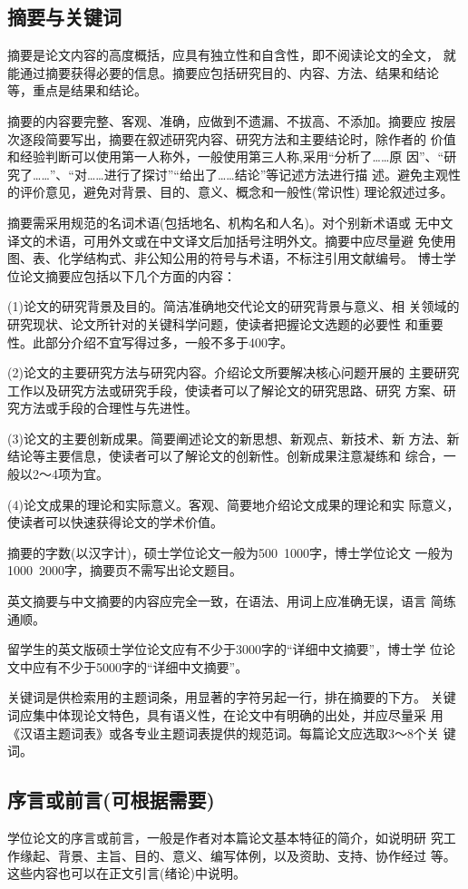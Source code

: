 \subsection{摘要与关键词}
摘要是论文内容的高度概括，应具有独立性和自含性，即不阅读论文的全文，
就能通过摘要获得必要的信息。摘要应包括研究目的、内容、方法、结果和结论
等，重点是结果和结论。 

摘要的内容要完整、客观、准确，应做到不遗漏、不拔高、不添加。摘要应
按层次逐段简要写出，摘要在叙述研究内容、研究方法和主要结论时，除作者的
价值和经验判断可以使用第一人称外，一般使用第三人称,采用“分析了……原
因”、“研究了……”、“对……进行了探讨”“给出了……结论”等记述方法进行描
述。避免主观性的评价意见，避免对背景、目的、意义、概念和一般性(常识性)
理论叙述过多。 

摘要需采用规范的名词术语(包括地名、机构名和人名)。对个别新术语或
无中文译文的术语，可用外文或在中文译文后加括号注明外文。摘要中应尽量避
免使用图、表、化学结构式、非公知公用的符号与术语，不标注引用文献编号。 
博士学位论文摘要应包括以下几个方面的内容： 

(1)论文的研究背景及目的。简洁准确地交代论文的研究背景与意义、相
关领域的研究现状、论文所针对的关键科学问题，使读者把握论文选题的必要性
和重要性。此部分介绍不宜写得过多，一般不多于400字。 

(2)论文的主要研究方法与研究内容。介绍论文所要解决核心问题开展的
主要研究工作以及研究方法或研究手段，使读者可以了解论文的研究思路、研究
方案、研究方法或手段的合理性与先进性。 

(3)论文的主要创新成果。简要阐述论文的新思想、新观点、新技术、新
方法、新结论等主要信息，使读者可以了解论文的创新性。创新成果注意凝练和
综合，一般以2～4项为宜。 

(4)论文成果的理论和实际意义。客观、简要地介绍论文成果的理论和实
际意义，使读者可以快速获得论文的学术价值。 

摘要的字数(以汉字计)，硕士学位论文一般为500~1000字，博士学位论文
一般为1000~2000字，摘要页不需写出论文题目。 

英文摘要与中文摘要的内容应完全一致，在语法、用词上应准确无误，语言
简练通顺。 

留学生的英文版硕士学位论文应有不少于3000字的“详细中文摘要”，博士学
位论文中应有不少于5000字的“详细中文摘要”。 

关键词是供检索用的主题词条，用显著的字符另起一行，排在摘要的下方。
关键词应集中体现论文特色，具有语义性，在论文中有明确的出处，并应尽量采
用《汉语主题词表》或各专业主题词表提供的规范词。每篇论文应选取3～8个关
键词。

\subsection{序言或前言(可根据需要)}
学位论文的序言或前言，一般是作者对本篇论文基本特征的简介，如说明研
究工作缘起、背景、主旨、目的、意义、编写体例，以及资助、支持、协作经过
等。这些内容也可以在正文引言(绪论)中说明。 

